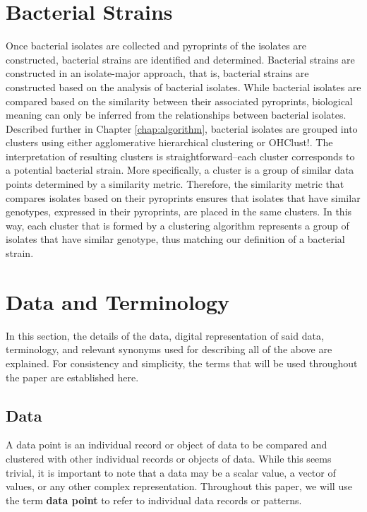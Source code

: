 \documentclass[12pt]{ucthesis}
\begin{document}
   \section{Bacterial Strains}\label{sec:strains}
      Once bacterial isolates are collected and pyroprints of the isolates are
      constructed, bacterial strains are identified and determined. Bacterial
      strains are constructed in an isolate-major approach, that is, bacterial
      strains are constructed based on the analysis of bacterial isolates. While
      bacterial isolates are compared based on the similarity between their
      associated pyroprints, biological meaning can only be inferred from the
      relationships between bacterial isolates. Described further in Chapter
      \ref{chap:algorithm}, bacterial isolates are grouped into clusters using
      either agglomerative hierarchical clustering or OHClust!. The
      interpretation of resulting clusters is straightforward--each cluster
      corresponds to a potential bacterial strain. More specifically, a cluster
      is a group of similar data points determined by a similarity metric.
      Therefore, the similarity metric that compares isolates based on their
      pyroprints ensures that isolates that have similar genotypes, expressed
      in their pyroprints, are placed in the same clusters. In this way, each
      cluster that is formed by a clustering algorithm represents a group of
      isolates that have similar genotype, thus matching our definition of a
      bacterial strain.

   \section{Data and Terminology}\label{sec:data_and_terms}
      In this section, the details of the data, digital representation of said
      data, terminology, and relevant synonyms used for describing all of the
      above are explained. For consistency and simplicity, the terms that will
      be used throughout the paper are established here.

      \subsection{Data}
      A data point is an individual record or object of data to be compared
      and clustered with other individual records or objects of data. While
      this seems trivial, it is important to note that a data may be a scalar
      value, a vector of values, or any other complex representation.
      Throughout this paper, we will use the term \textbf{data point} to refer
      to individual data records or patterns.
\end{document}
